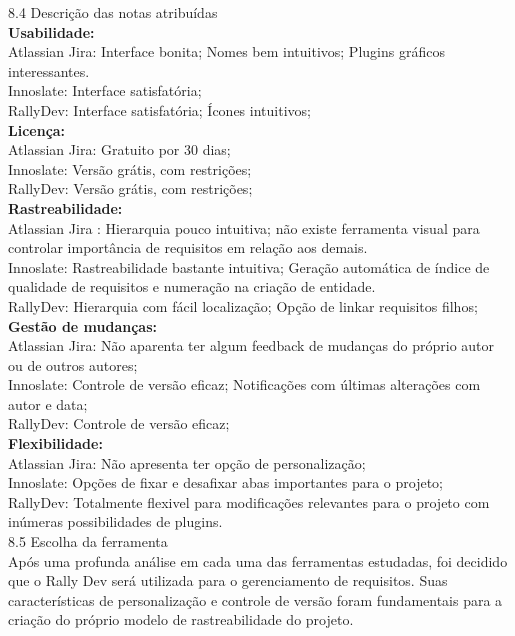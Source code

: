 {\large{8.4 Descrição das notas atribuídas}}\\

\textbf{Usabilidade:}\\
	\tab Atlassian Jira: Interface bonita; Nomes bem intuitivos; Plugins gráficos interessantes.\\
	\tab Innoslate: Interface satisfatória; \\
	\tab RallyDev: Interface satisfatória; Ícones intuitivos;\\

\textbf{Licença:}\\
	\tab Atlassian Jira: Gratuito por 30 dias;\\
	\tab Innoslate: Versão grátis, com restrições;\\
	\tab RallyDev: Versão grátis, com restrições;\\

\textbf{Rastreabilidade:}\\
	\tab Atlassian Jira : Hierarquia pouco intuitiva; não existe ferramenta visual para controlar importância de requisitos em relação aos demais.\\
	\tab Innoslate: Rastreabilidade bastante intuitiva; Geração automática de índice de qualidade de requisitos e numeração na criação de entidade.\\
	\tab RallyDev: Hierarquia com fácil localização; Opção de linkar requisitos filhos;\\

\textbf{Gestão de mudanças:}\\
	\tab Atlassian Jira: Não aparenta ter algum feedback de mudanças do próprio autor ou de outros autores;\\
	\tab Innoslate: Controle de versão eficaz; Notificações com últimas alterações com autor e data;\\
	\tab RallyDev: Controle de versão eficaz;\\

\textbf{Flexibilidade:} \\
	\tab Atlassian Jira: Não apresenta ter opção de personalização;\\
	\tab Innoslate: Opções de fixar e desafixar abas importantes para o projeto;\\
	\tab RallyDev: Totalmente flexivel para modificações relevantes para o projeto com inúmeras possibilidades de plugins.\\

{\large{8.5 Escolha da ferramenta}}\\

\tab Após uma profunda análise em cada uma das ferramentas estudadas, foi decidido que o Rally Dev será utilizada para o gerenciamento de requisitos. Suas características de personalização e controle de versão foram fundamentais para a criação do próprio modelo de rastreabilidade do projeto.  \\
